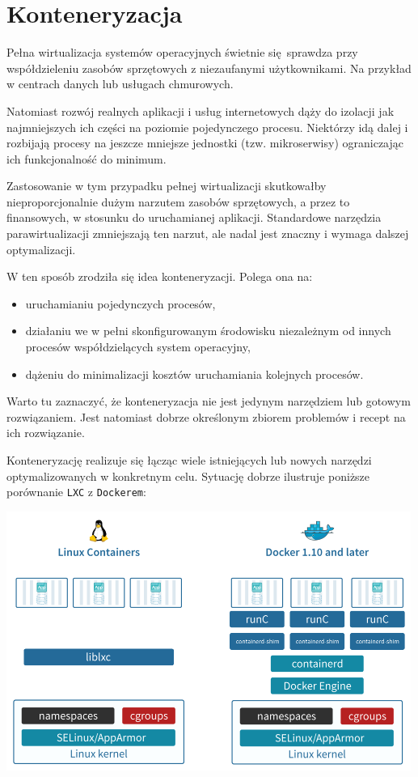 \documentclass[a4paper,12pt,twoside,openany]{report}
\providecommand{\tightlist}{%
  \setlength{\itemsep}{0pt}\setlength{\parskip}{0pt}}
\newcommand{\passthrough}[1]{#1}
\begin{document}
\pagebreak

\hypertarget{konteneryzacja}{%
\section{Konteneryzacja}\label{konteneryzacja}}

Pełna wirtualizacja systemów operacyjnych świetnie się~sprawdza przy
współdzieleniu zasobów sprzętowych z niezaufanymi użytkownikami. Na
przykład w centrach danych lub usługach chmurowych.

Natomiast rozwój realnych aplikacji i usług internetowych dąży do
izolacji jak najmniejszych ich części na poziomie pojedynczego procesu.
Niektórzy idą dalej i rozbijają procesy na jeszcze mniejsze jednostki
(tzw. mikroserwisy) ograniczając ich funkcjonalność do minimum.

Zastosowanie w tym przypadku pełnej wirtualizacji skutkowałby
nieproporcjonalnie dużym narzutem zasobów sprzętowych, a przez to
finansowych, w stosunku do uruchamianej aplikacji. Standardowe narzędzia
parawirtualizacji zmniejszają ten narzut, ale nadal jest znaczny i
wymaga dalszej optymalizacji.

W ten sposób zrodziła się idea konteneryzacji. Polega ona na:

\begin{itemize}
\tightlist
\item
  uruchamianiu pojedynczych procesów,
\item
  działaniu we w pełni skonfigurowanym środowisku niezależnym od innych
  procesów współdzielących system operacyjny,
\item
  dążeniu do minimalizacji kosztów uruchamiania kolejnych procesów.
\end{itemize}

Warto tu zaznaczyć, że konteneryzacja nie jest jedynym narzędziem lub
gotowym rozwiązaniem. Jest natomiast dobrze określonym zbiorem problemów
i recept na ich rozwiązanie.

\pagebreak

Konteneryzację realizuje się łącząc wiele istniejących lub nowych
narzędzi optymalizowanych w konkretnym celu. Sytuację dobrze ilustruje
poniższe porównanie \passthrough{\lstinline!LXC!} z
\passthrough{\lstinline!Dockerem!}:

\includegraphics[width=5.20833in,height=3.33333in]{assets/lxc-vs-docker.png}\\
\end{document}
